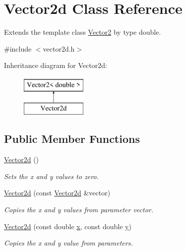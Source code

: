 \hypertarget{class_vector2d}{}\section{Vector2d Class Reference}
\label{class_vector2d}


Extends the template class \mbox{\hyperlink{class_vector2}{Vector2}} by type double.  




{\ttfamily \#include $<$vector2d.\+h$>$}

Inheritance diagram for Vector2d\+:\begin{figure}[H]
\begin{center}
\leavevmode
\includegraphics[height=2.000000cm]{class_vector2d}
\end{center}
\end{figure}
\subsection*{Public Member Functions}
\begin{DoxyCompactItemize}
\item 
\mbox{\label{class_vector2d_aa83b58eab6958e63fb0b0084b37ef806}} 
\mbox{\hyperlink{class_vector2d_aa83b58eab6958e63fb0b0084b37ef806}{Vector2d}} ()
\begin{DoxyCompactList}\small\item\em Sets the x and y values to zero. \end{DoxyCompactList}\item 
\mbox{\hyperlink{class_vector2d_aba5e7f4b80cfbd84005946a5b2b1b6ab}{Vector2d}} (const \mbox{\hyperlink{class_vector2d}{Vector2d}} \&vector)
\begin{DoxyCompactList}\small\item\em Copies the x and y values from parameter vector. \end{DoxyCompactList}\item 
\mbox{\hyperlink{class_vector2d_aa7456828fba87c279a117ee4d8745329}{Vector2d}} (const double \mbox{\hyperlink{class_vector2_a78fa1f2ed5e261c7fbeb8f3536a1ee34}{x}}, const double \mbox{\hyperlink{class_vector2_a6cfed8355591aa269f4dba43bd806ef9}{y}})
\begin{DoxyCompactList}\small\item\em Copies the x and y value from parameters. \end{DoxyCompactList}\end{DoxyCompactItemize}
